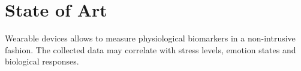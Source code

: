\section{State of Art}


Wearable devices allows to measure physiological biomarkers in a non-intrusive fashion. The collected data may correlate with stress levels, emotion states and biological responses. 